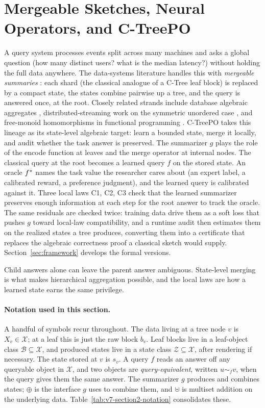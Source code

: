 \section{Mergeable Sketches, Neural Operators, and C-TreePO}
\label{sec:mergeable-sketches}

A query system processes events split across many machines and asks a
global question (how many distinct users? what is the median latency?)
without holding the full data anywhere. The data-systems literature
handles this with \emph{mergeable summaries}
\citep{Agarwal2013MergeableTODS}: each shard (the classical analogue
of a C-Tree leaf block) is replaced by a compact state, the states
combine pairwise up a tree, and the query is answered once, at the
root. Closely related strands include database algebraic
aggregates \citep{GrayEtAl1997DataCube}, distributed-streaming work on
the symmetric unordered case \citep{FeldmanEtAl2008MUD}, and free-monoid
homomorphisms in functional programming
\citep{Gibbons1996ThirdHomomorphism}. C-TreePO takes this lineage as its
state-level algebraic target: learn a bounded state, merge it locally,
and audit whether the task answer is preserved. The summarizer \(g\)
plays the role of the encode function at leaves and the merge operator
at internal nodes. The classical query at the root becomes a learned
query \(f\) on the stored state. An oracle \(f^\ast\) names the task
value the researcher cares about (an expert label, a calibrated reward,
a preference judgment), and the learned query is calibrated against it.
Three local laws C1, C2, C3 check that the learned summarizer preserves
enough information at each step for the root answer to track the
oracle. The same residuals are checked twice: training data drive them
as a soft loss that pushes \(g\) toward local-law compatibility, and a
runtime audit then estimates them on the realized states a tree
produces, converting them into a certificate that replaces the
algebraic correctness proof a classical sketch would supply.
Section~\ref{sec:framework} develops the formal versions.

Child answers alone can leave the parent answer ambiguous. State-level
merging is what makes hierarchical aggregation possible, and the local
laws are how a learned state earns the same privilege.

\paragraph{Notation used in this section.}
A handful of symbols recur throughout. The data living at a tree node
\(v\) is \(X_v\in\mathcal{X}\); at a leaf this is just the raw block
\(b_v\). Leaf blocks live in a leaf-object class
\(\mathcal{B}\subseteq\mathcal{X}\), and produced states live in a
state class \(\mathcal{Z}\subseteq\mathcal{X}\), after rendering if
necessary. The state stored at \(v\) is \(s_v\). A query \(f\) reads an
answer off any queryable object in \(\mathcal{X}\), and two objects are
\emph{query-equivalent}, written \(u\sim_f v\), when the query gives
them the same answer. The summarizer \(g\) produces and combines
states; \(\oplus\) is the interface \(g\) uses to combine them, and
\(\uplus\) is multiset addition on the underlying data.
Table~\ref{tab:v7-section2-notation} consolidates these.

